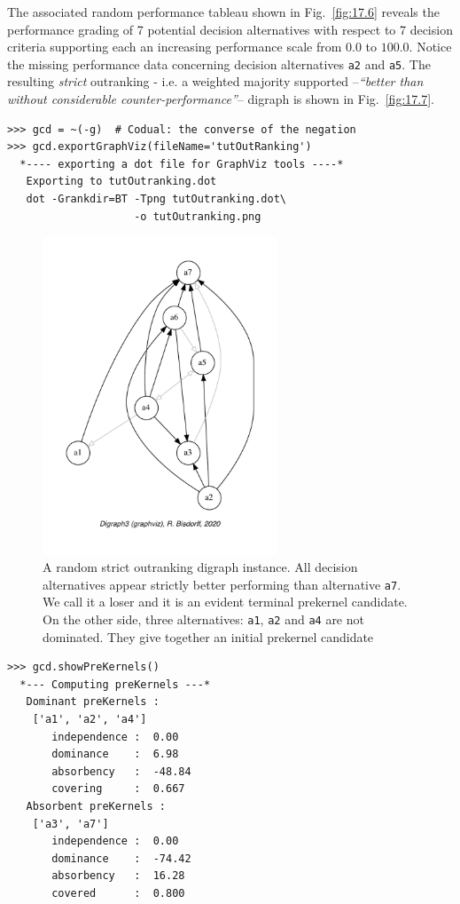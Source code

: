 The associated random performance tableau shown in Fig.~\vref{fig:17.6} reveals the performance grading of 7 potential decision alternatives with respect to 7 decision criteria supporting each an increasing performance scale from $0.0$ to $100.0$. Notice the missing performance data concerning decision alternatives \texttt{a2} and \texttt{a5}. The resulting \emph{strict} outranking - i.e. a weighted majority supported --\emph{``better than without considerable counter-performance''}-- digraph is shown in Fig.~\vref{fig:17.7}.
\begin{lstlisting}
>>> gcd = ~(-g)  # Codual: the converse of the negation
>>> gcd.exportGraphViz(fileName='tutOutRanking')
  *---- exporting a dot file for GraphViz tools ----*
   Exporting to tutOutranking.dot
   dot -Grankdir=BT -Tpng tutOutranking.dot\
                    -o tutOutranking.png\end{lstlisting}
\begin{figure}[ht]
\sidecaption[t]
\includegraphics[width=7cm]{Figures/17-7-tutOutranking.pdf}
\caption{A random strict outranking digraph instance. All decision alternatives appear strictly better performing than alternative \texttt{a7}. We call it a \Condorcet loser and it is an evident terminal prekernel candidate. On the other side, three alternatives: \texttt{a1}, \texttt{a2} and \texttt{a4} are not dominated. They give together an initial prekernel candidate}
\label{fig:17.7}       %
\end{figure}

\begin{lstlisting}[caption={Computing the prekernels of the strict outranking digraph \texttt{gcd}},label=list:17.13]
>>> gcd.showPreKernels()
  *--- Computing preKernels ---*
   Dominant preKernels :
    ['a1', 'a2', 'a4']
       independence :  0.00
       dominance    :  6.98
       absorbency   :  -48.84
       covering     :  0.667
   Absorbent preKernels :
    ['a3', 'a7']
       independence :  0.00
       dominance    :  -74.42
       absorbency   :  16.28
       covered      :  0.800
\end{lstlisting}

